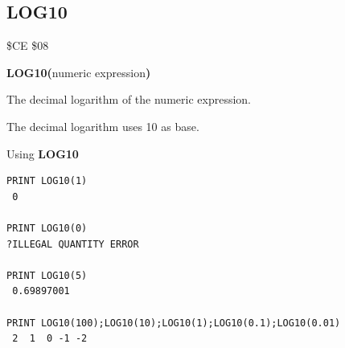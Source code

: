 \subsection{LOG10}
\begin{description}[leftmargin=2cm,style=nextline]
\item [Token:]    \$CE \$08

\item [Format:]   {\bf LOG10(}numeric expression{\bf)}

\item [Returns:]  The decimal logarithm of the numeric expression.

                  The decimal logarithm uses 10 as base.

\item [Examples:] Using {\bf LOG10}

\begin{tcolorbox}[colback=black,coltext=white]
\verbatimfont{\codefont}
\begin{verbatim}
PRINT LOG10(1)
 0

PRINT LOG10(0)
?ILLEGAL QUANTITY ERROR

PRINT LOG10(5)
 0.69897001

PRINT LOG10(100);LOG10(10);LOG10(1);LOG10(0.1);LOG10(0.01)
 2  1  0 -1 -2
\end{verbatim}
\end{tcolorbox}
\end{description}


\newpage
